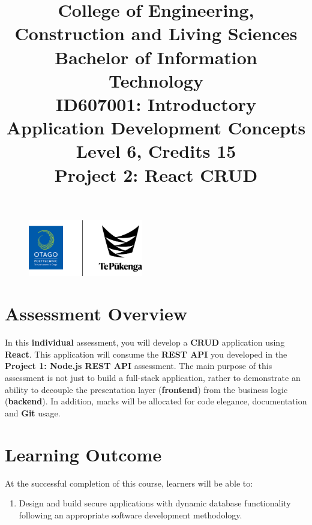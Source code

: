 \documentclass{article}
\author{}
\begin{document}
 

\begin{figure}
	\centering
	\includegraphics[width=50mm]{../img/logo.png}
\end{figure}

\title{College of Engineering, Construction and Living Sciences\\Bachelor of Information Technology\\ID607001: Introductory Application Development Concepts\\Level 6, Credits 15\\\textbf{Project 2: React CRUD}}
\date{}
\maketitle

\section*{Assessment Overview}
In this \textbf{individual} assessment, you will develop a \textbf{CRUD} application using \textbf{React}. This application will consume the \textbf{REST API} you developed in the \textbf{Project 1: Node.js REST API} assessment. The main purpose of this assessment is not just to build a full-stack application, rather to demonstrate an ability to decouple the presentation layer (\textbf{frontend}) from the business logic (\textbf{backend}). In addition, marks will be allocated for code elegance, documentation and \textbf{Git} usage. 

\section*{Learning Outcome}
At the successful completion of this course, learners will be able to:
\begin{enumerate}
	\item Design and build secure applications with dynamic database functionality following an appropriate software development methodology.
\end{enumerate}
\end{document}
